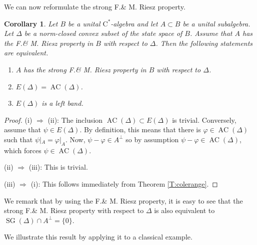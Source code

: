 \documentclass[10pt]{amsart}
\newcommand{\rC}{\mathrm{C}}
\renewcommand{\phi}{\varphi}
\newcommand{\AC}{\operatorname{AC}}
\newcommand{\SG}{\operatorname{SG}}
\newtheorem{corollary}[lemma]{Corollary}
\theoremstyle{definition}
\begin{document}
 We can now reformulate the strong F.\& M. Riesz property.   

\begin{corollary} \label{C:FMs}  Let $B$ be a unital $\rC^*$-algebra and let $A\subset B$ be a unital  subalgebra. Let $\Delta$ be a norm-closed convex subset of the state space of $B$.  Assume that $A$ has the F.\& M. Riesz property in $B$ with respect to $\Delta$. 
Then the  following statements are equivalent.  \begin{enumerate}[{\rm (i)}]
\item  $A$ has the strong F.\& M. Riesz property in $B$ with respect to $\Delta$.
\item  $E(\Delta) =  \AC(\Delta)$. 
\item $E(\Delta)$ is a left band.
\end{enumerate}
 \end{corollary}
\begin{proof} 

 (i) $\Rightarrow$ (ii): The inclusion $\AC(\Delta)\subset E(\Delta)$ is trivial. Conversely, assume that $\psi\in E(\Delta)$. By definition, this means that there is $\phi\in \AC(\Delta)$ such that $\psi|_A=\phi|_A$. Now, $\psi-\phi\in A^\perp$ so by assumption $\psi-\phi\in \AC(\Delta)$, which forces $\psi\in \AC(\Delta)$.
 
 (ii) $\Rightarrow$ (iii): This is trivial.
 
 (iii) $\Rightarrow$ (i):  This follows immediately from Theorem \ref{T:colerange}.
\end{proof}

We remark that by using the F.\& M. Riesz property,  it is easy to see that the  strong F.\& M. Riesz property with respect to $\Delta$ is also  equivalent to $\SG(\Delta)\cap A^\perp=\{0\}$.


  We illustrate this result by applying it to a classical example.
\end{document}
